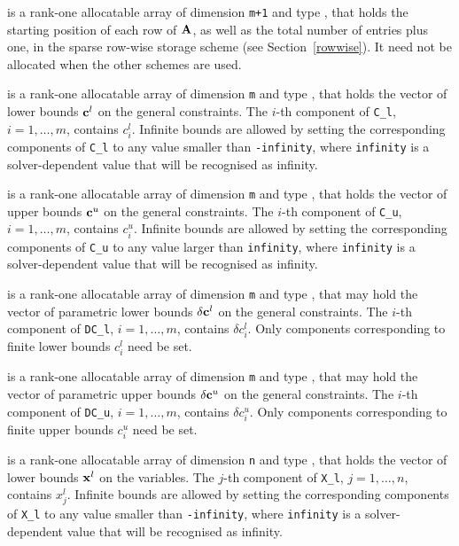 \documentclass{galahad}
\begin{document}
\begin{description}
\begin{description}
 is a rank-one allocatable array of dimension {\tt m+1} and type 
\integer, that holds the 
starting position of each row of ${\mathbf{A}}$, as well
as the total number of entries plus one, in the sparse row-wise storage
scheme (see Section~\ref{rowwise}). It need not be allocated when the
other schemes are used.

\end{description}

 is a rank-one allocatable array of dimension {\tt m} and type 
\realdp, that holds the vector of lower bounds ${\mathbf{c}}^{l}$ 
on the general constraints. The $i$-th component of 
{\tt C\_l}, $i = 1, \ldots , m$, contains $c_{i}^{l}$.
Infinite bounds are allowed by setting the corresponding 
components of {\tt C\_l} to any value smaller than {\tt -infinity}, 
where {\tt infinity} is a  solver-dependent value that will be recognised as
infinity.

 is a rank-one allocatable array of dimension {\tt m} and type 
\realdp, that holds the vector of upper bounds ${\mathbf{c}}^{u}$ 
on the general constraints. The $i$-th component of 
{\tt C\_u}, $i = 1,  \ldots ,  m$, contains $c_{i}^{u}$.
Infinite bounds are allowed by setting the corresponding 
components of {\tt C\_u} to any value larger than {\tt infinity}, 
where {\tt infinity} is a  solver-dependent value that will be recognised as
infinity.

 is a rank-one allocatable array of dimension {\tt m} and type 
\realdp, that may hold the vector of parametric lower bounds 
$\delta {\mathbf{c}}^{l}$ on the general constraints. The $i$-th component of 
{\tt DC\_l}, $i = 1, \ldots , m$, contains $\delta c_{i}^{l}$.
Only components corresponding to finite lower bounds $c_{i}^{l}$
need be set.

 is a rank-one allocatable array of dimension {\tt m} and type 
\realdp, that may hold the vector of parametric upper bounds 
$\delta {\mathbf{c}}^{u}$  on the general constraints. The $i$-th component of 
{\tt DC\_u}, $i = 1,  \ldots ,  m$, contains $\delta c_{i}^{u}$.
Only components corresponding to finite upper bounds $c_{i}^{u}$
need be set.

 is a rank-one allocatable array of dimension {\tt n} and type 
\realdp, that holds
the vector of lower bounds ${\mathbf{x}}^{l}$ on the variables.
The $j$-th component of {\tt X\_l}, $j = 1, \ldots , n$, 
contains $x_{j}^{l}$.
Infinite bounds are allowed by setting the corresponding 
components of {\tt X\_l} to any value smaller than {\tt -infinity}, 
where {\tt infinity} is a  solver-dependent value that will be recognised as
infinity.


\end{description}
\end{document}
